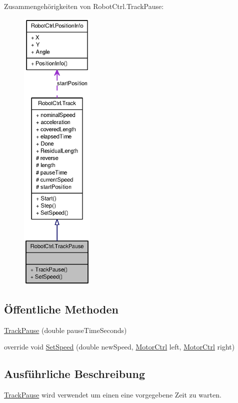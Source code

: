Zusammengehörigkeiten von RobotCtrl.TrackPause:\nopagebreak
\begin{figure}[H]
\begin{center}
\leavevmode
\includegraphics[height=400pt]{class_robot_ctrl_1_1_track_pause__coll__graph}
\end{center}
\end{figure}
\subsection*{Öffentliche Methoden}
\begin{DoxyCompactItemize}
\item 
\hyperlink{class_robot_ctrl_1_1_track_pause_ab869a1e5eb8a5db402ad7a7515700688}{TrackPause} (double pauseTimeSeconds)
\item 
override void \hyperlink{class_robot_ctrl_1_1_track_pause_a47133c69e455aa2c04f1bc3a6b5999b6}{SetSpeed} (double newSpeed, \hyperlink{class_robot_ctrl_1_1_motor_ctrl}{MotorCtrl} left, \hyperlink{class_robot_ctrl_1_1_motor_ctrl}{MotorCtrl} right)
\end{DoxyCompactItemize}


\subsection{Ausführliche Beschreibung}
\hyperlink{class_robot_ctrl_1_1_track_pause}{TrackPause} wird verwendet um einen eine vorgegebene Zeit zu warten. 

